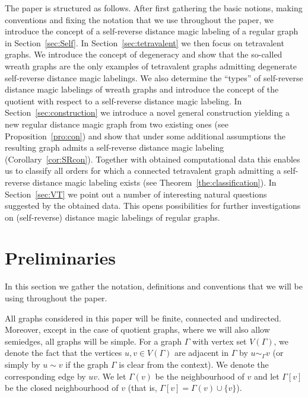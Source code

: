 \documentclass[11 pt,english]{article}
\newcommand{\G}{\Gamma}
\theoremstyle{definition}
\begin{document}
The paper is structured as follows. After first gathering the basic notions, making conventions and fixing the notation that we use throughout the paper, we introduce the concept of a self-reverse distance magic labeling of a regular graph in Section~\ref{sec:Self}. In Section~\ref{sec:tetravalent} we then focus on tetravalent graphs. We introduce the concept of degeneracy and show that the so-called wreath graphs are the only examples of tetravalent graphs admitting degenerate self-reverse distance magic labelings. We also determine the ``types'' of self-reverse distance magic labelings of wreath graphs and introduce the concept of the quotient with respect to a self-reverse distance magic labeling. In Section~\ref{sec:construction} we introduce a novel general construction yielding a new regular distance magic graph from two existing ones (see Proposition~\ref{pro:con}) and show that under some additional assumptions  the resulting graph admits a self-reverse distance magic labeling (Corollary~\ref{cor:SRcon}). Together with obtained computational data this enables us to classify all orders for which a connected tetravalent graph admitting a self-reverse distance magic labeling exists (see Theorem~\ref{the:classification}). In Section~\ref{sec:VT} we point out a number of interesting natural questions suggested by the obtained data. This opens possibilities for further investigations on (self-reverse) distance magic labelings of regular graphs.


\section{Preliminaries}
\label{sec:Prelim}

In this section we gather the notation, definitions and conventions that we will be using throughout the paper. 

All graphs considered in this paper will be finite, connected and undirected. Moreover, except in the case of quotient graphs, where we will also allow semiedges, all graphs will be simple. For a graph $\G$ with vertex set $V(\G)$, we denote the fact that the vertices $u, v \in V(\G)$ are adjacent in $\G$ by $u \sim_\G v$ (or simply by $u \sim v$ if the graph $\G$ is clear from the context). We denote the corresponding edge by $uv$. We let $\G(v)$ be the neighbourhood of $v$ and let $\G[v]$ be the closed neighbourhood of $v$ (that is, $\G[v] = \G(v) \cup \{v\}$).
\end{document}
